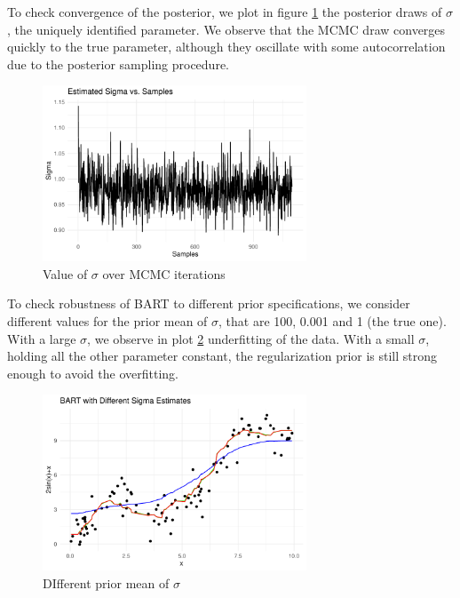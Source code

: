\documentclass[a4paper,11pt]{article}
\begin{document}
To check convergence of the posterior, we plot in figure \ref{plot_sin2} the posterior draws of $\sigma$, the uniquely identified parameter. We observe that the MCMC draw converges quickly to the true parameter, although they oscillate with some autocorrelation due to the posterior sampling procedure.

\begin{figure}
  \centering
  \includegraphics[width=0.7\textwidth]{../outputs/sigma_plot.pdf}
  \caption{Value of $\sigma$ over MCMC iterations}
  \label{plot_sin2}
\end{figure}


To check robustness of BART to different prior specifications, we consider different values for the prior mean of $\sigma$,  that are 100, 0.001 and 1 (the true one). With a large $\sigma$, we observe in plot \ref{plot_sin3} underfitting of the data. With a small $\sigma$, holding all the other parameter constant, the regularization prior is still strong enough to avoid the overfitting.

\begin{figure}
  \centering
  \includegraphics[width=0.7\textwidth]{../outputs/sin_plot_diff_sigma.pdf}
  \caption{DIfferent prior mean of $\sigma$}
  \label{plot_sin3}
\end{figure}
\end{document}
